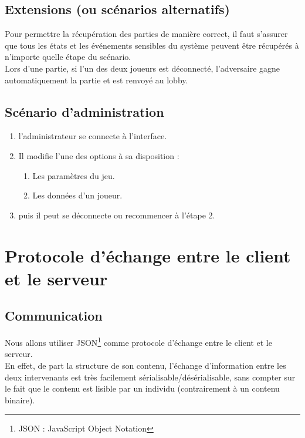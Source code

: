 \documentclass[a4paper,11pt]{article}
\begin{document}
		\subsection{Extensions (ou scénarios alternatifs)}
		Pour permettre la récupération des parties de manière correct, il faut s'assurer que tous les états et les événements sensibles du système peuvent être récupérés à n'importe quelle étape du scénario. \\

		Lors d'une partie, si l'un des deux joueurs est déconnecté, l'adversaire gagne automatiquement la partie et est renvoyé au lobby.

		\subsection{Scénario d'administration}
		\begin{enumerate}
			\item l'administrateur se connecte à l'interface.
			\item Il modifie l'une des options à sa disposition :
			\begin{enumerate}
				\item Les paramètres du jeu.
				\item Les données d'un joueur.
			\end{enumerate}
			\item puis il peut se déconnecte ou recommencer à l'étape 2.
		\end{enumerate}


	\newpage
	\section{Protocole d'échange entre le client et le serveur}
		\subsection{Communication}
			Nous allons utiliser JSON\footnote{JSON : JavaScript Object Notation} comme protocole d'échange entre le client et le serveur. \\
			En effet, de part la structure de son contenu, l'échange d'information entre les deux intervenants est très facilement sérialisable/désérialisable, sans compter sur le fait que le contenu est lisible par un individu (contrairement à un contenu binaire).
	
\end{document}
